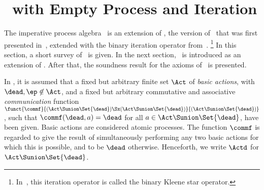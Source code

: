 \documentclass[runningheads]{llncs}
\begin{document}
\section{\ACP\ with Empty Process and Iteration}
\label{sect-ACPei}

The imperative process algebra \deACPei\ is an extension of \ACPei, 
the version of \ACP\ that was first presented 
in~\cite[Section~4.4]{BW90}, extended with the binary iteration operator 
from~\cite{BBP94a}.%
\footnote
{In~\cite{BBP94a}, this iteration operator is called the binary Kleene
 star operator.}
In this section, a short survey of \ACPei\ is given.
In the next section, \deACPei\ is introduced as an extension of 
\ACPei.
After that, the soundness result for the axioms of \deACPei\ is 
presented.

In \ACPei, it is assumed that a fixed but arbitrary finite set $\Act$ 
of \emph{basic actions}, with $\dead,\ep \not\in \Act$, and a fixed 
but arbitrary commutative and associative \emph{communication} function 
$\funct{\commf}
 {(\Act \Sunion \Set{\dead}) \Sx (\Act \Sunion \Set{\dead})}
 {(\Act \Sunion \Set{\dead})}$, 
such that $\commf(\dead,a) = \dead$ 
for all $a \in \Act \Sunion \Set{\dead}$, have been given.
Basic actions are considered atomic processes.
The function $\commf$ is regarded to give the result of simultaneously
performing any two basic actions for which this is possible, and to be 
$\dead$ otherwise.
Henceforth, we write $\Actd$ for $\Act \Sunion \Set{\dead}$.
\end{document}
